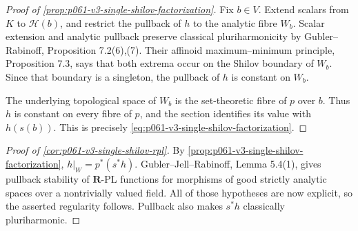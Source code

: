 
\begin{proof}[Proof of
\cref{prop:p061-v3-single-shilov-factorization}]
Fix \(b\in V\). Extend scalars from \(K\) to \(\mathscr H(b)\), and
restrict the pullback of \(h\) to the analytic fibre \(W_b\). Scalar
extension and analytic pullback preserve classical pluriharmonicity by
Gubler--Rabinoff, Proposition 7.2(6),(7). Their affinoid
maximum--minimum principle, Proposition 7.3, says that both extrema occur
on the Shilov boundary of \(W_b\). Since that boundary is a singleton, the
pullback of \(h\) is constant on \(W_b\).

The underlying topological space of \(W_b\) is the set-theoretic fibre of
\(p\) over \(b\). Thus \(h\) is constant on every fibre of \(p\), and the
section identifies its value with \(h(s(b))\). This is precisely
\eqref{eq:p061-v3-single-shilov-factorization}.
\end{proof}

\begin{proof}[Proof of \cref{cor:p061-v3-single-shilov-rpl}]
By \cref{prop:p061-v3-single-shilov-factorization},
\(h|_W=p^*(s^*h)\). Gubler--Jell--Rabinoff, Lemma 5.4(1), gives pullback
stability of \(\mathbf R\)-PL functions for morphisms of good strictly
analytic spaces over a nontrivially valued field. All of those hypotheses
are now explicit, so the asserted regularity follows. Pullback also makes
\(s^*h\) classically pluriharmonic.
\end{proof}

